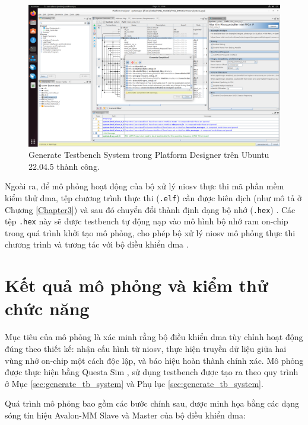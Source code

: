\begin{figure}[htbp]
    \centering
    \includegraphics[width=\linewidth]{Images/04_00_UbuntuGenerateTestbenchSystem.png}
    \caption{Generate Testbench System trong Platform Designer trên Ubuntu 22.04.5 thành công.}
    \label{fig:04_01_UbuntuGenerateTestbenchSystem}
\end{figure}

Ngoài ra, để mô phỏng hoạt động của bộ xử lý \acrshort{niosv} thực thi mã phần mềm kiểm thử \acrshort{dma}, tệp chương trình thực thi (\texttt{.elf}) cần được biên dịch (như mô tả ở Chương \ref{Chapter3}) và sau đó chuyển đổi thành định dạng bộ nhớ (\texttt{.hex}) \cite{intelNiosVSoftwareDevHandbook}. Các tệp \texttt{.hex} này sẽ được testbench tự động nạp vào mô hình bộ nhớ \acrshort{ram} on-chip trong quá trình khởi tạo mô phỏng, cho phép bộ xử lý \acrshort{niosv} mô phỏng thực thi chương trình và tương tác với bộ điều khiển \acrshort{dma} \cite{intelNiosVHandbook}.

\section{Kết quả mô phỏng và kiểm thử chức năng}
\label{sec:simulation_results} %

Mục tiêu của mô phỏng là xác minh rằng bộ điều khiển \acrshort{dma} tùy chỉnh hoạt động đúng theo thiết kế: nhận cấu hình từ \acrshort{niosv}, thực hiện truyền dữ liệu giữa hai vùng nhớ on-chip một cách độc lập, và báo hiệu hoàn thành chính xác. Mô phỏng được thực hiện bằng Questa Sim \cite{intelNiosVHandbook}, sử dụng testbench được tạo ra theo quy trình ở Mục \ref{sec:generate_tb_system} và Phụ lục \ref{sec:generate_tb_system}.

Quá trình mô phỏng bao gồm các bước chính sau, được minh họa bằng các dạng sóng tín hiệu Avalon-MM Slave và Master của bộ điều khiển \acrshort{dma}:

